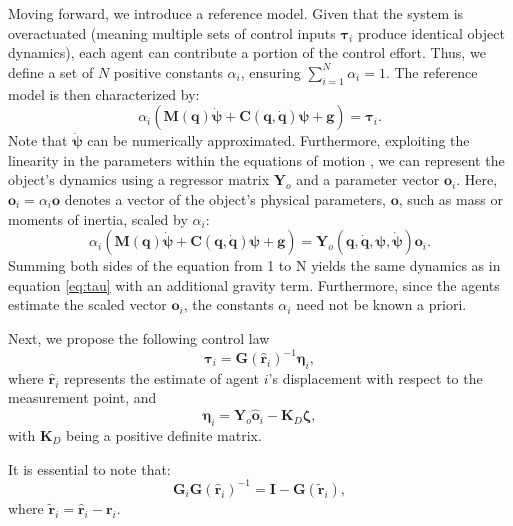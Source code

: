 Moving forward, we introduce a reference model. Given that the system is overactuated (meaning multiple sets of control inputs $\boldsymbol{\tau}_i$ produce identical object dynamics), each agent can contribute a portion of the control effort. Thus, we define a set of $N$ positive constants $\alpha_i$, ensuring $\sum_{i=1}^N\alpha_i=1$. The reference model is then characterized by:
\begin{equation}
    \alpha _i \left(\mathbf {M}(\mathbf {q})\dot{\boldsymbol{\psi}} + \mathbf {C}(\mathbf {q},\dot{\mathbf {q}})\boldsymbol{\psi} + \mathbf {g} \right) = \boldsymbol{\tau}_i.
\end{equation}
Note that $\dot{\boldsymbol{\psi}}$ can be numerically approximated. Furthermore, exploiting the linearity in the parameters within the equations of motion \citep{spong2020robot}, we can represent the object's dynamics using a regressor matrix $\mathbf{Y}_o$ and a parameter vector $\mathbf{o}_i$. Here, $\mathbf{o}_i = \alpha_i\mathbf{o}$ denotes a vector of the object's physical parameters, $\mathbf{o}$, such as mass or moments of inertia, scaled by $\alpha_i$:
\begin{equation}
    \alpha _i \left(\mathbf {M}(\mathbf {q})\dot{\boldsymbol{\psi}} + \mathbf {C}(\mathbf {q},\dot{\mathbf {q}})\boldsymbol{\psi} + \mathbf {g} \right) = \mathbf {Y}_o\left(\mathbf{q},\dot{\mathbf{q}},\boldsymbol{\psi}, \dot{\boldsymbol{\psi}}\right) \mathbf {o}_i. \label{eq:linearparametrizationModelRef}
\end{equation}
Summing both sides of the equation from 1 to N yields the same dynamics as in equation \eqref{eq:tau} with an additional gravity term. Furthermore, since the agents estimate the scaled vector $\mathbf{o}_i$, the constants $\alpha_i$ need not be known a priori.

Next, we propose the following control law
\begin{equation}
    \boldsymbol{\tau}_i = \mathbf{G}(\hat{\mathbf{r}}_i)^{-1}\boldsymbol{\eta}_i,\label{eq:controlLawTaui}
\end{equation}
where $\hat{\mathbf{r}}_i$ represents the estimate of agent $i$'s displacement with respect to the measurement point, and
\begin{equation}
    \boldsymbol{\eta}_i = \mathbf{Y}_o\hat{\mathbf{o}}_i - \mathbf{K}_D\boldsymbol{\zeta}, \label{eq:controlLawEtai}
\end{equation}
with $\mathbf{K}_D$ being a positive definite matrix.

It is essential to note that:
\begin{equation}
    \mathbf{G}_i\mathbf{G}(\hat{\mathbf{r}}_i)^{-1} = \mathbf{I} - \mathbf{G}(\widetilde{\mathbf{r}}_i), \label{eq:relationGiGiInvtoProof}
\end{equation}
where $\widetilde{\mathbf{r}}_i = \hat{\mathbf{r}}_i - \mathbf{r}_i$.


